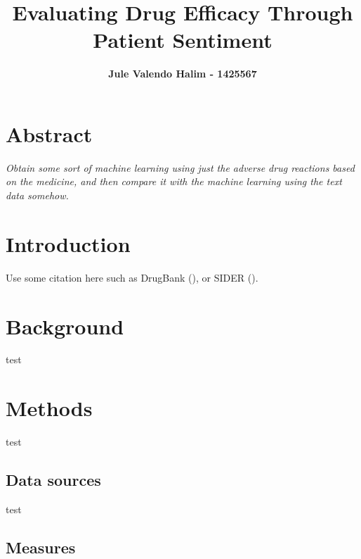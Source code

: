 \documentclass[10.7pt,]{article}
\title{\vspace{-2em} Evaluating Drug Efficacy Through Patient Sentiment}
\author[ ]{\bf\fontsize{13}{14}\selectfont Jule Valendo Halim - 1425567\vspace{1em}}
\date{} %
\begin{document}
\maketitle
\vspace{-4em} %

\begin{multicols}{2}

\section{Abstract}\label{abstract}

\emph{Obtain some sort of machine learning using just the adverse drug reactions based on the medicine, and then compare it with the machine learning using the text data somehow.}




\section{Introduction}\label{introduction}
Use some citation here such as DrugBank (\cite{knuth:1984}), or SIDER (\cite{latex2e}). 

\section{Background}\label{background}

test

\section{Methods}\label{methods}

test

\subsection{Data sources}\label{data-sources}

test

\subsection{Measures}\label{measures}


\end{multicols}
\end{document}
